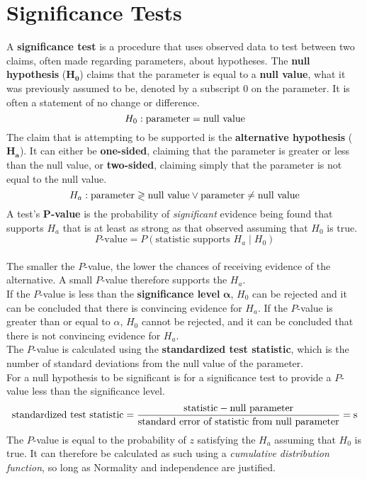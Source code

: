 \documentclass[../AP_Statistics.tex]{subfiles}
\begin{document}
	\chapter{Significance Tests}
		A \textbf{significance test} is a procedure that uses observed data to test between two claims, often made regarding parameters, about hypotheses.
		The \textbf{null hypothesis} ($\pmb{H_0}$) claims that the parameter is equal to a \textbf{null value}, what it was previously assumed to be, denoted by a subscript $0$ on the parameter. It is often a statement of no change or difference.
		\[H_0:\rm{parameter} = \text{null value}\]
		The claim that is attempting to be supported is the \textbf{alternative hypothesis} ($\pmb{H_a}$). It can either be \textbf{one-sided}, claiming that the parameter is greater or less than the null value, or \textbf{two-sided}, claiming simply that the parameter is not equal to the null value.
		\[H_a:\rm{parameter} \gtrless \text{null value} \lor \rm{parameter} \ne \text{null value}\]
		A test's $\pmb{P}$\textbf{-value} is the probability of \emph{significant} evidence being found that supports $H_a$ that is at least as strong as that observed assuming that $H_0$ is true.
		\[P\text{-value} = P(\text{statistic supports } H_a \mid H_0)\] \\
		The smaller the $P$-value, the lower the chances of receiving evidence of the alternative. A small $P$-value therefore supports the $H_a$. \\
		If the $P$-value is less than the \textbf{significance level} $\pmb{\alpha}$, $H_0$ can be rejected and it can be concluded that there is convincing evidence for $H_a$. If the $P$-value is greater than or equal to $\alpha$, $H_0$ cannot be rejected, and it can be concluded that there is not convincing evidence for $H_a$. \\
		The $P$-value is calculated using the \textbf{standardized test statistic}, which is the number of standard deviations from the null value of the parameter. \\
		For a null hypothesis to be significant is for a significance test to provide a $P$-value less than the significance level.
		\[\text{standardized test statistic} = \frac{\text{statistic} - \text{null parameter}}{\text{standard error of statistic from null parameter}} = \mathrm{s}\]
		The $P$-value is equal to the probability of $z$ satisfying the $H_a$ assuming that $H_0$ is true. It can therefore be calculated as such using a \emph{cumulative distribution function}, so long as Normality and independence are justified.
\end{document}

